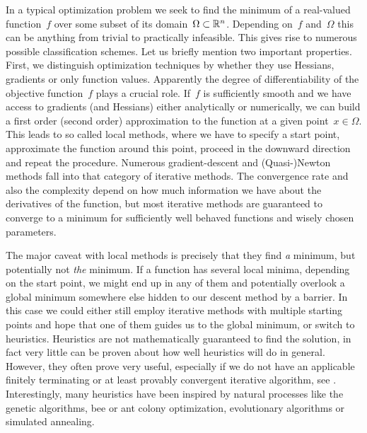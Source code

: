 In a typical optimization problem we seek to find the minimum of a real-valued
function~$f$ over some subset of its domain~$\Omega \subset \mathbb{R}^n$. Depending
on~$f$ and~$\Omega$ this can be anything from trivial to practically infeasible.
This gives rise to numerous possible classification schemes. Let us briefly
mention two important properties. First, we distinguish optimization techniques
by whether they use Hessians, gradients or only function values. Apparently the
degree of differentiability of the objective function~$f$ plays a crucial role.
If~$f$ is sufficiently smooth and we have access to gradients (and Hessians)
either analytically or numerically, we can build a first order (second order)
approximation to the function at a given point~$x \in \Omega$. This leads to so
called local methods, where we have to specify a start point, approximate the
function around this point, proceed in the downward direction and repeat the
procedure. Numerous gradient-descent and (Quasi-)Newton methods fall into that
category of iterative methods. The convergence rate and also the complexity
depend on how much information we have about the derivatives of the function,
but most iterative methods are guaranteed to converge to a minimum for
sufficiently well behaved functions and wisely chosen parameters.

The major caveat with local methods is precisely that they find \emph{a}
minimum, but potentially not \emph{the} minimum. If a function has several local
minima, depending on the start point, we might end up in any of them and
potentially overlook a global minimum somewhere else hidden to our descent
method by a barrier. In this case we could either still employ iterative methods
with multiple starting points and hope that one of them guides us to the global
minimum, or switch to heuristics. Heuristics are not mathematically guaranteed
to find the solution, in fact very little can be proven about how well
heuristics will do in general. However, they often prove very useful, especially
if we do not have an applicable finitely terminating or at least provably
convergent iterative algorithm, see . Interestingly,
many heuristics have been inspired by natural processes like the genetic
algorithms, bee or ant colony optimization, evolutionary algorithms or simulated
annealing.

